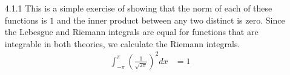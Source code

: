 \documentclass[../../Solutions.tex]{subfiles}
\begin{document}
\begin{itemize}

	\item [4.1.1] This is a simple exercise of showing that the norm of each of these functions is $1$ and the inner product between any two distinct is zero.
		Since the Lebesgue and Riemann integrals are equal for functions that are integrable in both theories, we calculate the Riemann integrals.
		\begin{equation*} \begin{split}
			\int_{-\pi}^{\pi} \left(\frac{1}{\sqrt{2\pi}}\right)^2 dx &= 1 \\
		\end{split} \end{equation*}	

\end{itemize}
\end{document}
